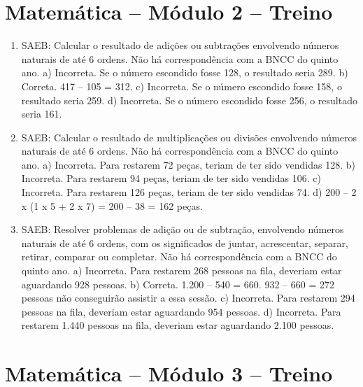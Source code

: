\section*{Matemática -- Módulo 2 -- Treino}

\begin{enumerate}
\item
SAEB: Calcular o resultado de adições ou subtrações envolvendo números naturais de até 6 ordens.
Não há correspondência com a BNCC do quinto ano.
a) Incorreta. Se  o número escondido fosse 128, o resultado seria 289.
b) Correta. 417 -- 105 = 312.
c) Incorreta. Se  o número escondido fosse 158, o resultado seria 259.
d) Incorreta. Se  o número escondido fosse 256, o resultado seria 161.

\item
SAEB: Calcular o resultado de multiplicações ou divisões envolvendo números naturais de até 6 ordens.
Não há correspondência com a BNCC do quinto ano.
a) Incorreta. Para restarem 72 peças, teriam de ter sido vendidas 128.
b) Incorreta. Para restarem 94 peças, teriam de ter sido vendidas 106.
c) Incorreta. Para restarem 126 peças, teriam de ter sido vendidas 74.
d) 200 -- 2 x (1 x 5 + 2 x 7) = 200 -- 38 = 162 peças.

\item
SAEB: Resolver problemas de adição ou de subtração, envolvendo números naturais de até 6 ordens, com os significados de juntar, acrescentar, separar, retirar, comparar ou completar.
Não há correspondência com a BNCC do quinto ano.
a) Incorreta. Para restarem 268 pessoas na fila, deveriam estar aguardando 928 pessoas.
b) Correta.
1.200 -- 540 = 660.
932 -- 660 = 272 pessoas não conseguirão assistir a essa sessão.
c) Incorreta. Para restarem 294 pessoas na fila, deveriam estar aguardando 954 pessoas.
d) Incorreta. Para restarem 1.440 pessoas na fila, deveriam estar aguardando 2.100 pessoas.
\end{enumerate}

\section*{Matemática -- Módulo 3 -- Treino}

